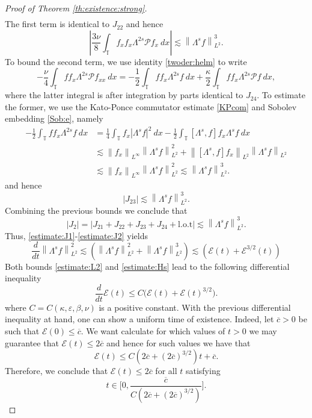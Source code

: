 \documentclass[reqno]{amsart}
\newcommand{\TT}{\mathbb T}
\newcommand{\norm}[1]{\left\lVert#1\right\rVert}
\newcommand\abs[1]{\left|#1\right|}
\theoremstyle{definition}
\numberwithin{equation}{section}
\numberwithin{theorem}{section}
\numberwithin{definition}{section}
\begin{document}
\begin{proof}[Proof of Theorem \ref{th:existence:strong}]
\begin{align*}
\end{align*}
The first term is identical to $J_{22}$ and hence
\[ \abs{\frac{3\nu}{8}\int_{\TT} f_{x}f_{x} \Lambda^{2s}\mathcal{P}f_{x}\ dx}\lesssim  \norm{\Lambda^{s}f}_{L^{2}}^{3}.\]
To bound the second term, we use identity \eqref{twoder:helm}  to write
\[  -\frac{\nu}{4}\int_{\TT} ff_{x} \Lambda^{2s}\mathcal{P}f_{xx} \ dx= -\frac{1}{2}\int_{\TT} ff_{x} \Lambda^{2s}f \ dx+ \frac{\kappa}{2}\int_{\TT} ff_{x} \Lambda^{2s}\mathcal{P}f \ dx,\]
where the latter integral is after integration by parts identical to $J_{24}$. To estimate the former, we use the Kato-Ponce commutator estimate \eqref{KPcom}  and Sobolev embedding \eqref{Sob:e}, namely
\begin{align*}
-\frac{1}{2}\int_{\TT} ff_{x} \Lambda^{2s}f \ dx&=\frac{1}{4}\int_{\TT} f_{x} |\Lambda^{s}f |^{2} \ dx-\frac{1}{2}\int_{\TT} [\Lambda^{s},f]f_{x}  \Lambda^{s}f \ dx \\
&\lesssim \norm{f_{x}}_{L^{\infty}} \norm{\Lambda^{s}f}^{2}_{L^2}+\norm{ [\Lambda^{s},f]f_{x}}_{L^2}\norm{\Lambda^{s}f}_{L^2} \\
&\lesssim \norm{f_{x}}_{L^{\infty}}\norm{\Lambda^{s}f}^{2}_{L^2} \lesssim \norm{\Lambda^{s}f}^{3}_{L^2}.
\end{align*}
and hence
\[ \abs{J_{23}}\lesssim \norm{\Lambda^{s}f}^{3}_{L^2}.\]
Combining the previous bounds we conclude that
\begin{equation}\label{estimate:J2}
\abs{J_{2}} =\abs{ J_{21}+J_{22}+J_{23}+J_{24}+ \mbox{l.o.t}} \lesssim  \norm{\Lambda^{s}f}^{3}_{L^2}.
\end{equation}
Thus, \eqref{estimate:J1}-\eqref{estimate:J2} yields
\begin{equation}\label{estimate:Hs}
 \frac{d}{dt}\norm{\Lambda^{s}f}_{L^{2}}^{2}\lesssim \left(\norm{\Lambda^{s}f}^{2}_{L^2}+\norm{\Lambda^{s}f}^{3}_{L^2}
\right)\lesssim \left( \mathcal{E}(t)+ \mathcal{E}^{3/2}(t)\right)
 \end{equation}
Both bounds \eqref{estimate:L2} and \eqref{estimate:Hs} lead to the following differential inequality
\begin{equation}\label{energy:ine}
\frac{d}{dt}\mathcal{E}(t)\le C\big(\mathcal{E}(t)+\mathcal{E}(t)^{3/2}\big).
\end{equation}
where $C=C(\kappa,\varepsilon,\beta,\nu)$ is a positive constant.  With the previous differential inequality at hand, one can show a uniform time of existence. Indeed, let $\overline{c}>0$ be such that $\mathcal{E}(0)\leq \overline{c}$. We want calculate for which values of $t>0$ we may guarantee that $\mathcal{E}(t)\leq 2\overline{c}$ and hence for such values we have that
\[ \mathcal{E}(t)\leq C \left(2\overline{c}+(2\overline{c})^{3/2} \right)t + \overline{c}.\]
Therefore, we conclude that $\mathcal{E}(t)\leq 2\overline{c}$ for all $t$ satisfying
\[ t\in \bigg[0, \frac{\overline{c}}{C \left(2\overline{c}+(2\overline{c})^{3/2} \right)}\bigg]. \]

\end{proof}
\end{document}

